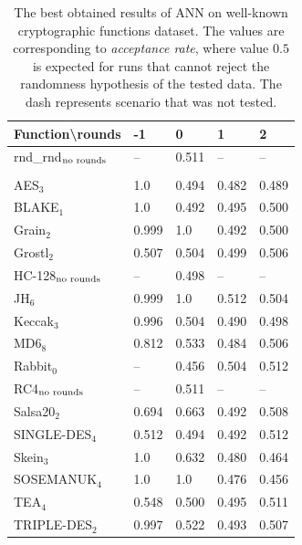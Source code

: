 \documentclass[
  print, %
  Table,   %
  nolof,     %
  nolot,     %
  11pt, %
  oneside  %
]{fithesis3}
\newcommand{\fd}{\cellcolor{red!13}}
\newcommand{\fn}{\cellcolor{green!13}}
\begin{document}
\begin{table}[t]
\centering
\begin{tabular}{l|l l l l}
Function\textbackslash{}rounds & -1 & 0 & 1 & 2\\ \hline
rnd\_rnd$_{\textnormal{no rounds}}$& -- & \fn{}0.511 & --         & --         \\\\
AES$_{3}$        & \fd{}1.0   & \fn{}0.494 & \fn{}0.482 & \fn{}0.489 \\
BLAKE$_{1}$      & \fd{}1.0   & \fn{}0.492 & \fn{}0.495 & \fn{}0.500 \\
Grain$_{2}$      & \fd{}0.999 & \fd{}1.0   & \fn{}0.492 & \fn{}0.500 \\
Grostl$_{2}$     & \fn{}0.507 & \fn{}0.504 & \fn{}0.499 & \fn{}0.506 \\
HC-128$_{\textnormal{no rounds}}$& --    & \fn{}0.498 & -- & --      \\
JH$_{6}$         & \fd{}0.999 & \fd{}1.0   & \fn{}0.512 & \fn{}0.504 \\
Keccak$_{3}$     & \fd{}0.996 & \fn{}0.504 & \fn{}0.490 & \fn{}0.498 \\
MD6$_{8}$        & \fd{}0.812 & \fn{}0.533 & \fn{}0.484 & \fn{}0.506 \\
Rabbit$_{0}$     &      --    & \fn{}0.456 & \fn{}0.504 & \fn{}0.512 \\
RC4$_{\textnormal{no rounds}}$& --         & \fn{}0.511 & --         & --         \\
Salsa20$_{2}$    & \fd{}0.694 & \fd{}0.663 & \fn{}0.492 & \fn{}0.508 \\
SINGLE-DES$_{4}$ & \fn{}0.512 & \fn{}0.494 & \fn{}0.492 & \fn{}0.512 \\
Skein$_{3}$      & \fd{}1.0   & \fd{}0.632 & \fn{}0.480 & \fn{}0.464 \\
SOSEMANUK$_{4}$  & \fd{}1.0   & \fn{}1.0   & \fn{}0.476 & \fn{}0.456 \\
TEA$_{4}$        & \fn{}0.548 & \fn{}0.500 & \fn{}0.495 & \fn{}0.511 \\
TRIPLE-DES$_{2}$ & \fd{}0.997 & \fn{}0.522 & \fn{}0.493 & \fn{}0.507
\end{tabular}
\caption{The best obtained results of ANN on well-known cryptographic functions dataset. The values are corresponding to \textit{acceptance rate}, where value $0.5$ is expected for runs that cannot reject the randomness hypothesis of the tested data. The dash represents scenario that was not tested.}
\label{table:res-usable-ann}
\end{table}
\end{document}
